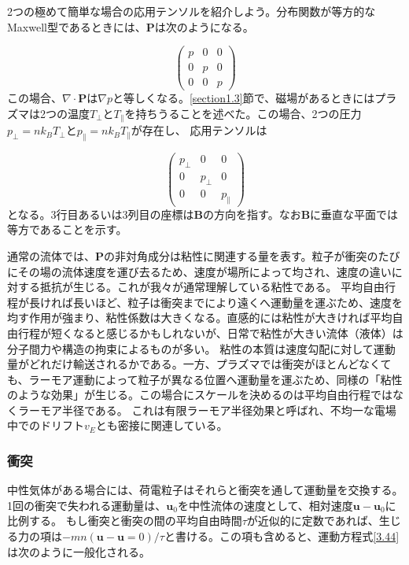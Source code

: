 \documentclass{ltjsarticle}
\numberwithin{equation}{section} %
\begin{document}
2つの極めて簡単な場合の応用テンソルを紹介しよう。分布関数が等方的なMaxwell型であるときには、$\bm{P}$は次のようになる。

\begin{equation}
  \begin{pmatrix}
    p & 0 & 0\\
    0 & p & 0\\
    0 & 0 & p
  \end{pmatrix} \label{3.45}
\end{equation}
この場合、$\nabla \cdot \bm{P}$は$\nabla p$と等しくなる。\ref{section1.3}節で、磁場があるときにはプラズマは2つの温度$T_\perp$と$T_\parallel$を持ちうることを述べた。この場合、2つの圧力$p_\perp = nk_BT_\perp$と$p_\parallel = nk_BT_\parallel$が存在し、
応用テンソルは

\begin{equation}
  \begin{pmatrix}
    p_\perp & 0 & 0\\
    0 & p_\perp & 0\\
    0 & 0 & p_\parallel
  \end{pmatrix} \label{3.46}
\end{equation}
となる。3行目あるいは3列目の座標は$\bm{B}$の方向を指す。なお$\bm{B}$に垂直な平面では等方であることを示す。

通常の流体では、$\bm{P}$の非対角成分は粘性に関連する量を表す。粒子が衝突のたびにその場の流体速度を運び去るため、速度が場所によって均され、速度の違いに対する抵抗が生じる。これが我々が通常理解している粘性である。
平均自由行程が長ければ長いほど、粒子は衝突までにより遠くへ運動量を運ぶため、速度を均す作用が強まり、粘性係数は大きくなる。直感的には粘性が大きければ平均自由行程が短くなると感じるかもしれないが、日常で粘性が大きい流体（液体）は分子間力や構造の拘束によるものが多い。
粘性の本質は速度勾配に対して運動量がどれだけ輸送されるかである。一方、プラズマでは衝突がほとんどなくても、ラーモア運動によって粒子が異なる位置へ運動量を運ぶため、同様の「粘性のような効果」が生じる。この場合にスケールを決めるのは平均自由行程ではなくラーモア半径である。
これは有限ラーモア半径効果と呼ばれ、不均一な電場中でのドリフト$v_E$とも密接に関連している。


\subsubsection{衝突} \label{section3.3.3}
中性気体がある場合には、荷電粒子はそれらと衝突を通して運動量を交換する。1回の衝突で失われる運動量は、$\bm{u}_0$を中性流体の速度として、相対速度$\bm{u}-\bm{u}_0$に比例する。
もし衝突と衝突の間の平均自由時間$\tau$が近似的に定数であれば、生じる力の項は$-mn(\bm{u}- \bm{u}=0)/\tau$と書ける。この項も含めると、運動方程式\eqref{3.44}は次のように一般化される。
\end{document}
